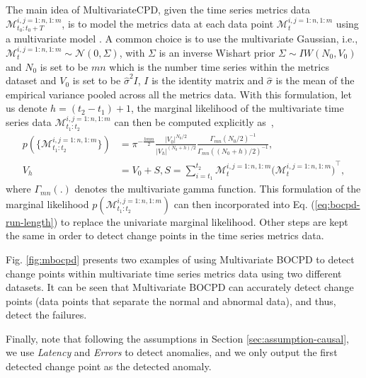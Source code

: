 The main idea of MultivariateCPD, given the time series metrics data $\mathcal{M}^{i,j=1:n,1:m}_{t_0:t_0+T}$, is to model the metrics data at each data point $\mathcal{M}^{i,j=1:n,1:m}_t$ using a multivariate model \cite{xuan2007modeling}. A common choice is to use the multivariate Gaussian, i.e., $\mathcal{M}^{i,j=1:n,1:m}_t \sim \mathcal{N}(0, \Sigma)$, with $\Sigma$ is an inverse Wishart prior $\Sigma \sim IW(N_0, V_0)$ and $N_0$ is set to be $mn$ which is the number time series within the metrics dataset and $V_0$ is set to be $\hat{\sigma}^2 I$, $I$ is the identity matrix and $\hat{\sigma}$ is the mean of the empirical variance pooled across all the metrics data. With this formulation, let us denote $h=(t_2-t_1)+1$, the marginal likelihood of the multivariate time series data $\mathcal{M}^{i,j=1:n,1:m}_{t_1:t_2}$ can then be computed explicitly as~\cite{xuan2007modeling},
\begin{equation}
\begin{aligned}
p(\{\mathcal{M}^{i,j=1:n,1:m}_{t_1:t_2}\}) &= \pi^{-\frac{hmn}{2}} \frac{\vert V_0 \vert^{N_0/2}}{\vert V_h\vert^{(N_0+h)/2}}  \frac{\Gamma_{mn}(N_0/2)^{-1}}{\Gamma_{mn}((N_0+h)/2)^{-1}}, \\
V_h &= V_0 + S, S=\sum_{i=t_1}^{t_2}  \mathcal{M}^{i,j=1:n,1:m}_t {\big(\mathcal{M}^{i,j=1:n,1:m}_t\big)}^\intercal,
\end{aligned}
\end{equation}
where $\Gamma_{mn}(.)$ denotes the multivariate gamma function. This formulation of the marginal likelihood $p(\mathcal{M}^{i,j=1:n,1:m}_{t_1:t_2})$ can then incorporated into Eq. (\ref{eq:bocpd-run-length}) to replace the univariate marginal likelihood. Other steps are kept the same in order to detect change points in the time series metrics data.

Fig. \ref{fig:mbocpd} presents two examples of using Multivariate BOCPD to detect change points within multivariate time series metrics data using two different datasets. It can be seen that Multivariate BOCPD can accurately detect change points (data points that separate the normal and abnormal data), and thus, detect the failures.

Finally, note that following the assumptions in Section \ref{sec:assumption-causal}, we use \textit{Latency} and \textit{Errors} to detect anomalies, and we only output the first detected change point as the detected anomaly.



